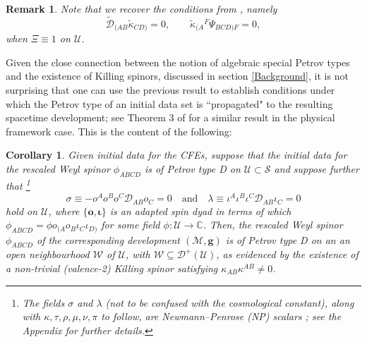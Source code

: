 \documentclass[10pt,a4paper]{article}
\theoremstyle{plain}
\newtheorem{corollary}{Corollary}
\newtheorem{remark}{Remark}
\def\bmg{{\bm g}}
\def\bmo{{\bm o}}
\begin{document}
\begin{remark}{\em 
Note that we recover the conditions from \cite{BaeVal10a}, namely
\[\tilde{\mathcal{D}}_{(AB}\tilde{\kappa}_{CD)}=0, \qquad \tilde{\kappa}_{(A}{}^F
\Psi_{BCD)F}=0, \] when $\Xi\equiv 1$ on $\mathcal{U}$.  }
\end{remark}
Given the close connection between the notion of algebraic special Petrov types
and the existence of Killing spinors, discussed in section
\ref{Background}, it is not surprising that one can use the previous
result to establish conditions under which the Petrov type of an
initial data set is ``propagated" to the resulting spacetime
development; see Theorem 3 of \cite{GarVal08c} for a similar result in
the physical framework case. This is the content of the following:

\begin{corollary}\label{Corollary:PetrovPropagation}
  Given initial data for the CFEs, suppose that the initial data for the rescaled Weyl spinor
  $\phi_{ABCD}$ is of Petrov type D on $\mathcal{U}\subset\mathcal{S}$
  and suppose further that
  \footnote{The fields $\sigma$ and $\lambda$ (not to be confused with
  the cosmological constant), along with $\kappa, \tau, \rho, \mu,
  \nu, \pi$ to follow, are Newmann--Penrose (NP) scalars
  \cite{PenRin84, PenRin86}; see the Appendix for further details.}
\begin{equation} 
\sigma\equiv - o^A o^B o^C\mathcal{D}_{AB}o_C=0 \quad \text{and}\quad
\lambda\equiv
\iota^A\iota^B\iota^C\mathcal{D}_{AB}\iota_C=0\label{ShearConditions}
\end{equation}
hold on $\mathcal{U}$, where $\lbrace \bmo, \bm\iota\rbrace$ is an
adapted spin dyad in terms of which $\phi_{ABCD}=\phi
o_{(A}o_B\iota_C\iota_{D)}$ for some field $\phi:\mathcal{U}\rightarrow\mathbb{C}$.  Then, the rescaled
Weyl spinor $\phi_{ABCD}$ of the corresponding development $(\mathcal{M},\bmg)$ 
is of Petrov type D on an an open neighbourhood $\mathcal{W}$ of
$\mathcal{U}$, with $\mathcal{W}\subseteq\mathcal{D}^+(\mathcal{U})$, as evidenced by the
existence of a non-trivial (valence-2) Killing spinor satisfying
$\kappa_{AB}\kappa^{AB}\neq 0$.
\end{corollary}
\end{document}
